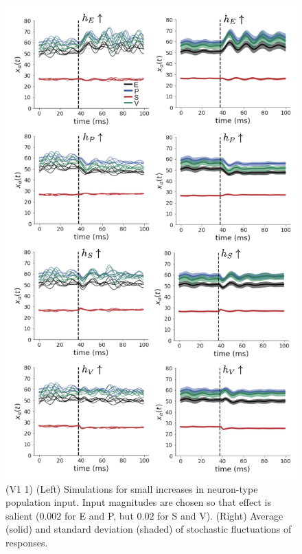 \documentclass[11pt]{article}
\begin{document}
\begin{figure}
\begin{center}
\includegraphics[scale=.8]{figures/figV1_1/figV1_1.pdf}
\end{center}
\caption{\small (V1 1)
(Left) Simulations for small increases in neuron-type population input.
Input magnitudes are chosen so that effect is salient ($0.002$ for E and P, but $0.02$ for S and V).
(Right) Average (solid) and standard deviation (shaded) of stochastic fluctuations of responses.
 }
 \label{fig:V1_1}
\end{figure}
\end{document}
